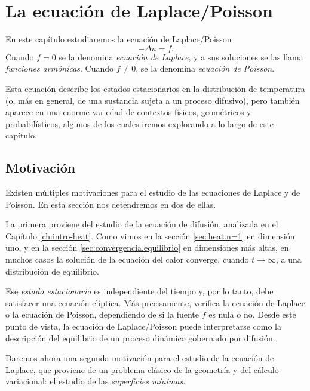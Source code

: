 \documentclass[12pt, a4paper]{amsbook}
\theoremstyle{remark}
\theoremstyle{definition}
\numberwithin{section}{chapter}
\numberwithin{subsection}{section}
\numberwithin{equation}{section}
\numberwithin{figure}{chapter}
\begin{document}
\chapter{La ecuación de Laplace/Poisson}\label{chap:laplace}

En este capítulo estudiaremos la ecuación de Laplace/Poisson
\[
-\Delta u = f.
\]
Cuando $f=0$ se la denomina \emph{ecuación de Laplace}, y a sus soluciones se las llama \emph{funciones armónicas}. Cuando $f\neq 0$, se la denomina \emph{ecuación de Poisson}.

Esta ecuación describe los estados estacionarios en la distribución de temperatura (o, más en general, de una sustancia sujeta a un proceso difusivo), pero también aparece en una enorme variedad de contextos físicos, geométricos y probabilísticos, algunos de los cuales iremos explorando a lo largo de este capítulo.

\section{Motivación}\label{sec:minimas}

Existen múltiples motivaciones para el estudio de las ecuaciones de Laplace y de Poisson. En esta sección nos detendremos en dos de ellas.

La primera proviene del estudio de la ecuación de difusión, analizada en el Capítulo \ref{ch:intro-heat}. Como vimos en la sección \ref{sec:heat.n=1} en dimensión uno, y en la sección \ref{sec:convergencia.equilibrio} en dimensiones más altas, en muchos casos la solución de la ecuación del calor converge, cuando $t\to\infty$, a una distribución de equilibrio.

Ese \emph{estado estacionario} es independiente del tiempo y, por lo tanto, debe satisfacer una ecuación elíptica. Más precisamente, verifica la ecuación de Laplace o la ecuación de Poisson, dependiendo de si la fuente $f$ es nula o no. Desde este punto de vista, la ecuación de Laplace/Poisson puede interpretarse como la descripción del equilibrio de un proceso dinámico gobernado por difusión.

Daremos ahora una segunda motivación para el estudio de la ecuación de Laplace, que proviene de un problema clásico de la geometría y del cálculo variacional: el estudio de las \emph{superficies mínimas}.
\end{document}
